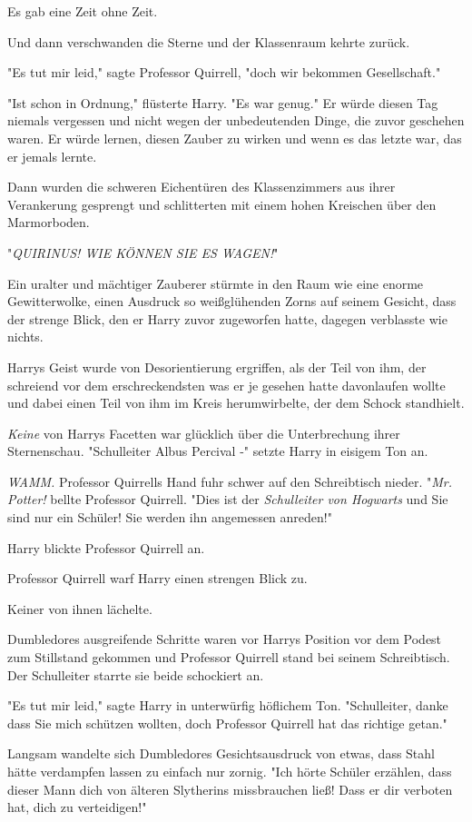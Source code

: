 {Es gab eine Zeit ohne Zeit.

Und dann verschwanden die Sterne und der Klassenraum kehrte zurück.

"Es tut mir leid," sagte Professor Quirrell, "doch wir bekommen Gesellschaft."

"Ist schon in Ordnung," flüsterte Harry. "Es war genug." Er würde diesen Tag niemals vergessen und nicht wegen der unbedeutenden Dinge, die zuvor geschehen waren. Er würde lernen, diesen Zauber zu wirken und wenn es das letzte war, das er jemals lernte.

Dann wurden die schweren Eichentüren des Klassenzimmers aus ihrer Verankerung gesprengt und schlitterten mit einem hohen Kreischen über den Marmorboden.

"\emph{QUIRINUS! WIE KÖNNEN SIE ES WAGEN!}"

Ein uralter und mächtiger Zauberer stürmte in den Raum wie eine enorme Gewitterwolke, einen Ausdruck so weißglühenden Zorns auf seinem Gesicht, dass der strenge Blick, den er Harry zuvor zugeworfen hatte, dagegen verblasste wie nichts.

Harrys Geist wurde von Desorientierung ergriffen, als der Teil von ihm, der schreiend vor dem erschreckendsten was er je gesehen hatte davonlaufen wollte und dabei einen Teil von ihm im Kreis herumwirbelte, der dem Schock standhielt.

\emph{Keine} von Harrys Facetten war glücklich über die Unterbrechung ihrer Sternenschau. "Schulleiter Albus Percival -" setzte Harry in eisigem Ton an.

\emph{WAMM.} Professor Quirrells Hand fuhr schwer auf den Schreibtisch nieder. "\emph{Mr. Potter!} bellte Professor Quirrell. "Dies ist der \emph{Schulleiter von Hogwarts} und Sie sind nur ein Schüler! Sie werden ihn angemessen anreden!"

Harry blickte Professor Quirrell an.

Professor Quirrell warf Harry einen strengen Blick zu.

Keiner von ihnen lächelte.

Dumbledores ausgreifende Schritte waren vor Harrys Position vor dem Podest zum Stillstand gekommen und Professor Quirrell stand bei seinem Schreibtisch. Der Schulleiter starrte sie beide schockiert an.

"Es tut mir leid," sagte Harry in unterwürfig höflichem Ton. "Schulleiter, danke dass Sie mich schützen wollten, doch Professor Quirrell hat das richtige getan."

Langsam wandelte sich Dumbledores Gesichtsausdruck von etwas, dass Stahl hätte verdampfen lassen zu einfach nur zornig. "Ich hörte Schüler erzählen, dass dieser Mann dich von älteren Slytherins missbrauchen ließ! Dass er dir verboten hat, dich zu verteidigen!"

}
